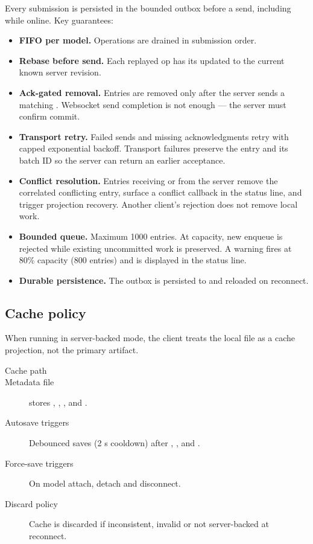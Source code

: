 Every submission is persisted in the bounded outbox before a send, including
while online. Key guarantees:

\begin{itemize}
\item \textbf{FIFO per model.} Operations are drained in submission order.
\item \textbf{Rebase before send.} Each replayed op has its
   updated to the current known server revision.
\item \textbf{Ack-gated removal.} Entries are removed only after the server
  sends a matching . Websocket send completion is not
  enough --- the server must confirm commit.
\item \textbf{Transport retry.} Failed sends and missing acknowledgments
  retry with capped exponential backoff. Transport failures preserve the entry
  and its batch ID so the server can return an earlier acceptance.
\item \textbf{Conflict resolution.} Entries receiving
   or  from the server
  remove the correlated conflicting entry, surface a conflict callback in the
  status line, and trigger projection recovery. Another client's rejection
  does not remove local work.
\item \textbf{Bounded queue.} Maximum 1000 entries. At capacity, new enqueue
  is rejected while existing uncommitted work is preserved. A warning fires
  at 80\% capacity (800 entries) and is displayed in the status line.
\item \textbf{Durable persistence.} The outbox is persisted to
  and reloaded on reconnect.
\end{itemize}

\subsection{Cache policy}

When running in server-backed mode, the client treats the local
 file as a cache projection, not the primary artifact.

\begin{description}
\item[Cache path] 
\item[Metadata file]  stores
  , , ,
   and .
\item[Autosave triggers] Debounced saves (2 s cooldown) after
  , ,
   and .
\item[Force-save triggers] On model attach, detach and disconnect.
\item[Discard policy] Cache is discarded if inconsistent, invalid or not
  server-backed at reconnect.
\end{description}

